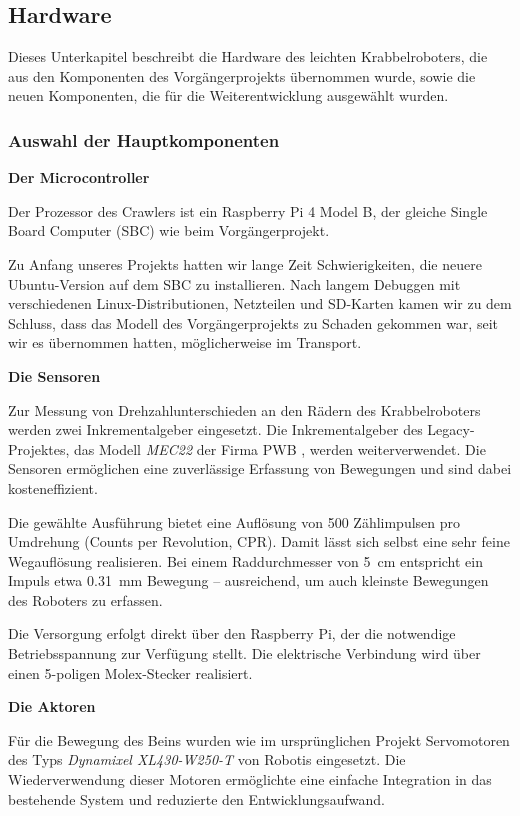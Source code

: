 \subsection{Hardware}

Dieses Unterkapitel beschreibt die Hardware des leichten Krabbelroboters, die aus den Komponenten des Vorgängerprojekts übernommen wurde, sowie die neuen Komponenten, die für die Weiterentwicklung ausgewählt wurden.

\subsubsection{Auswahl der Hauptkomponenten}

\textbf{Der Microcontroller}

Der Prozessor des Crawlers ist ein Raspberry Pi 4 Model B, der gleiche Single Board Computer (SBC) wie beim Vorgängerprojekt.

Zu Anfang unseres Projekts hatten wir lange Zeit Schwierigkeiten, die neuere Ubuntu-Version auf dem SBC zu installieren. Nach langem Debuggen mit verschiedenen Linux-Distributionen, Netzteilen und SD-Karten kamen wir zu dem Schluss, dass das Modell des Vorgängerprojekts zu Schaden gekommen war, seit wir es übernommen hatten, möglicherweise im Transport.

\textbf{Die Sensoren}

Zur Messung von Drehzahlunterschieden an den Rädern des Krabbelroboters werden zwei Inkrementalgeber eingesetzt. Die Inkrementalgeber des Legacy-Projektes, das Modell \textit{MEC22} der Firma PWB \cite{pwb_me16_datasheet_2011}, werden weiterverwendet. Die Sensoren ermöglichen eine zuverlässige Erfassung von Bewegungen und sind dabei kosteneffizient.

Die gewählte Ausführung bietet eine Auflösung von 500 Zählimpulsen pro Umdrehung (Counts per Revolution, CPR). Damit lässt sich selbst eine sehr feine Wegauflösung realisieren. Bei einem Raddurchmesser von \qty{5}{\centi\m} entspricht ein Impuls etwa \qty{0,31}{\milli\m} Bewegung – ausreichend, um auch kleinste Bewegungen des Roboters zu erfassen.

Die Versorgung erfolgt direkt über den Raspberry Pi, der die notwendige Betriebsspannung zur Verfügung stellt. Die elektrische Verbindung wird über einen 5-poligen Molex-Stecker realisiert.

\textbf{Die Aktoren}

Für die Bewegung des Beins wurden wie im ursprünglichen Projekt Servomotoren des Typs \textit{Dynamixel XL430-W250-T} von Robotis \cite{robotis_xl430} eingesetzt. Die Wiederverwendung dieser Motoren ermöglichte eine einfache Integration in das bestehende System und reduzierte den Entwicklungsaufwand. 

